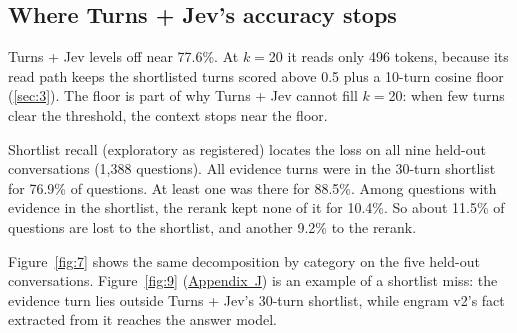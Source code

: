 \documentclass[11pt]{article}
\newcommand{\src}[1]{}
\begin{document}
\subsection{Where Turns + Jev's accuracy stops}\label{sec:5.6}
Turns + Jev levels off near 77.6\%\src{bench/results/v3/batch\_a\_report.json\#fresh/T0R k20/accuracy}. At $k{=}$20 it reads only 496\src{bench/results/v3/batch\_a\_report.json\#fresh/T0R k20/tokens\_mean} tokens, because its read path keeps the shortlisted turns scored above 0.5\src{docs/V3\_PLAN.md §1, §2, §4} plus a 10\src{docs/V3\_PLAN.md §1, §2, §4}-turn cosine floor (\cref{sec:3}). The floor is part of why Turns + Jev cannot fill $k{=}$20: when few turns clear the threshold, the context stops near the floor.

Shortlist recall (exploratory as registered) locates the loss on all nine held-out conversations (1,388\src{bench/results/v3/shortlist\_recall.json\#all\_nine/all/questions} questions). All evidence turns were in the 30\src{docs/V3\_PLAN.md §1, §2, §4}-turn shortlist for 76.9\%\src{bench/results/v3/shortlist\_recall.json\#all\_nine/all/shortlist\_recall\_all} of questions. At least one was there for 88.5\%\src{bench/results/v3/shortlist\_recall.json\#all\_nine/all/shortlist\_recall\_any}. Among questions with evidence in the shortlist, the rerank kept none of it for 10.4\%\src{bench/results/v3/shortlist\_recall.json\#all\_nine/all/rerank\_drops\_all\_shortlisted\_evidence}. So about 11.5\%\src{bench/results/v3/shortlist\_recall.json\#all\_nine/all (1 - shortlist\_recall\_any)} of questions are lost to the shortlist, and another 9.2\%\src{bench/results/v3/shortlist\_recall.json\#all\_nine/all (shortlist\_recall\_any x rerank\_drops\_all\_shortlisted\_evidence)} to the rerank.

Figure~\ref{fig:7} shows the same decomposition by category on the five held-out conversations. Figure~\ref{fig:9} (\hyperref[app:J]{Appendix~J}) is an example of a shortlist miss: the evidence turn lies outside Turns + Jev's 30\src{docs/V3\_PLAN.md §1, §2, §4}-turn shortlist, while engram v2's fact extracted from it reaches the answer model.
\end{document}
